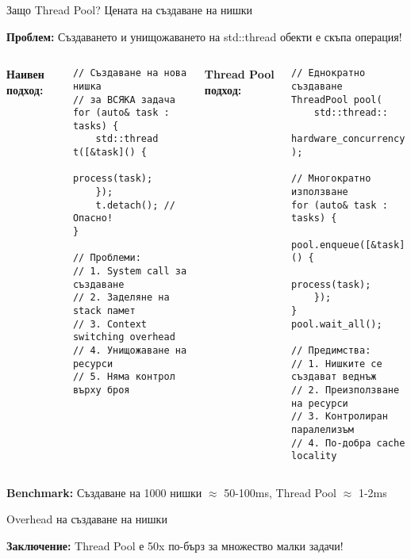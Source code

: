 \documentclass[aspectratio=169]{beamer}
\begin{document}
\begin{frame}[fragile]{Защо Thread Pool? Цената на създаване на нишки}

\textbf{Проблем:} Създаването и унищожаването на std::thread обекти е скъпа операция!

\begin{columns}
\textbf{Наивен подход:}
\begin{lstlisting}[basicstyle=\ttfamily\tiny]
// Създаване на нова нишка 
// за ВСЯКА задача
for (auto& task : tasks) {
    std::thread t([&task]() {
        process(task);
    });
    t.detach(); // Опасно!
}

// Проблеми:
// 1. System call за създаване
// 2. Заделяне на stack памет
// 3. Context switching overhead
// 4. Унищожаване на ресурси
// 5. Няма контрол върху броя
\end{lstlisting}

\textbf{Thread Pool подход:}
\begin{lstlisting}[basicstyle=\ttfamily\tiny]
// Еднократно създаване
ThreadPool pool(
    std::thread::
    hardware_concurrency()
);

// Многократно използване
for (auto& task : tasks) {
    pool.enqueue([&task]() {
        process(task);
    });
}
pool.wait_all();

// Предимства:
// 1. Нишките се създават веднъж
// 2. Преизползване на ресурси
// 3. Контролиран паралелизъм
// 4. По-добра cache locality
\end{lstlisting}
\end{columns}

\vspace{0.2cm}
\centering
\textbf{Benchmark:} Създаване на 1000 нишки $\approx$ 50-100ms, Thread Pool $\approx$ 1-2ms
\end{frame}

\begin{frame}{Overhead на създаване на нишки}
\begin{center}
\end{center}

\textbf{Заключение:} Thread Pool е 50x по-бърз за множество малки задачи!
\end{frame}
\end{document}
